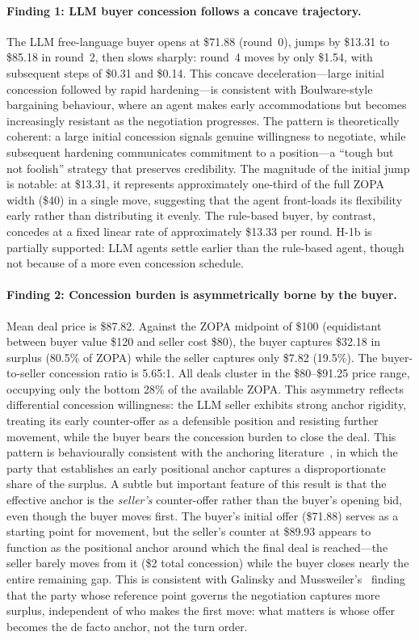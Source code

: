 \paragraph{Finding 1: LLM buyer concession follows a concave trajectory.}
The LLM free-language buyer opens at \$71.88 (round~0), jumps by \$13.31 to \$85.18 in round~2, then slows sharply: round~4 moves by only \$1.54, with subsequent steps of \$0.31 and \$0.14.  This concave deceleration---large initial concession followed by rapid hardening---is consistent with Boulware-style bargaining behaviour, where an agent makes early accommodations but becomes increasingly resistant as the negotiation progresses.  The pattern is theoretically coherent: a large initial concession signals genuine willingness to negotiate, while subsequent hardening communicates commitment to a position---a ``tough but not foolish'' strategy that preserves credibility.  The magnitude of the initial jump is notable: at \$13.31, it represents approximately one-third of the full ZOPA width (\$40) in a single move, suggesting that the agent front-loads its flexibility early rather than distributing it evenly.  The rule-based buyer, by contrast, concedes at a fixed linear rate of approximately \$13.33 per round.  H-1b is partially supported: LLM agents settle earlier than the rule-based agent, though not because of a more even concession schedule.

\paragraph{Finding 2: Concession burden is asymmetrically borne by the buyer.}
Mean deal price is \$87.82.  Against the ZOPA midpoint of \$100 (equidistant between buyer value \$120 and seller cost \$80), the buyer captures \$32.18 in surplus (80.5\% of ZOPA) while the seller captures only \$7.82 (19.5\%).  The buyer-to-seller concession ratio is 5.65:1.  All deals cluster in the \$80--\$91.25 price range, occupying only the bottom 28\% of the available ZOPA.  This asymmetry reflects differential concession willingness: the LLM seller exhibits strong anchor rigidity, treating its early counter-offer as a defensible position and resisting further movement, while the buyer bears the concession burden to close the deal.  This pattern is behaviourally consistent with the anchoring literature~\cite{galinsky2001}, in which the party that establishes an early positional anchor captures a disproportionate share of the surplus.  A subtle but important feature of this result is that the effective anchor is the \emph{seller's} counter-offer rather than the buyer's opening bid, even though the buyer moves first.  The buyer's initial offer (\$71.88) serves as a starting point for movement, but the seller's counter at \$89.93 appears to function as the positional anchor around which the final deal is reached---the seller barely moves from it (\$2 total concession) while the buyer closes nearly the entire remaining gap.  This is consistent with Galinsky and Mussweiler's~\cite{galinsky2001} finding that the party whose reference point governs the negotiation captures more surplus, independent of who makes the first move: what matters is whose offer becomes the de facto anchor, not the turn order.

